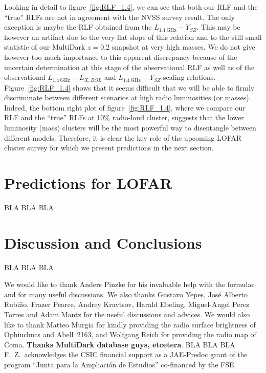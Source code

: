 \documentclass[traditabstract]{aa}
\newcommand{\rmn}{\mathrm}
\begin{document}
Looking in detail to figure~\ref{fig:RLF_1.4}, we can see that both our RLF and the ``true'' RLFs are not in agreement with the NVSS survey result. The only exception is maybe the RLF obtained from the $L_{1.4~\rmn{GHz}}-Y_{SZ}$. This may be however an artifact due to the very flat slope of this relation and to the still small statistic of our MultiDark $z = 0.2$ snapshot at very high masses. We do not give however too much importance to this apparent discrepancy because of the uncertain determination at this stage of the observational RLF as well as of the observational $L_{1.4~\rmn{GHz}}-L_{X, BOL}$ and $L_{1.4~\rmn{GHz}}-Y_{SZ}$ scaling relations. Figure~\ref{fig:RLF_1.4} shows that it seems difficult that we will be able to firmly discriminate between different scenarios at high radio luminosities (or masses). Indeed, the bottom right plot of figure~\ref{fig:RLF_1.4}, where we compare our RLF and the ``true'' RLFs at 10\% radio-loud cluster, suggests that the lower luminosity (mass) clusters will be the most powerful way to disentangle between different models. Therefore, it is clear the key role of the upcoming LOFAR cluster survey for which we present predictions in the next section.


\section{Predictions for LOFAR}
\label{sec:5}
BLA BLA BLA\\


\section{Discussion and Conclusions}
\label{sec:6}
BLA BLA BLA\\


\begin{acknowledgements}
We would like to thank Anders Pinzke for his invaluable help with the formulae and for many useful discussions. We also thanks Gustavo Yepes, Jos\'e Alberto Rubi\~no, Frazer Pearce, Andrey Kravtsov, Harald Ebeling, Miguel-Angel Perez Torres and Adam Mantz for the useful discussions and advices. We would also like to thank Matteo Murgia for kindly providing the radio surface brightness of Ophiuchucs and Abell~2163, and Wolfgang Reich for providing the radio map of Coma. {\bf Thanks MultiDark database guys, etcetera}.
BLA BLA BLA\\ 
F.~Z.~acknowledges the CSIC financial support as a JAE-Predoc grant of the program ``Junta para la Ampliaci\'on de Estudios'' co-financed by the FSE.
\end{acknowledgements}
\end{document}
